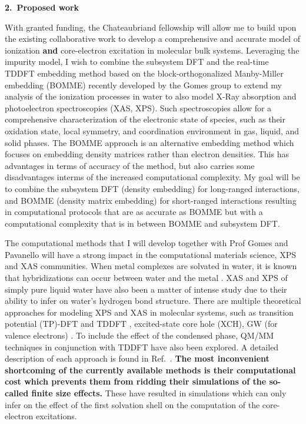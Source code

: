 \documentclass[notitlepage,12pt]{report}
\begin{document}
\textbf{\large 2.\ Proposed work}
    
    With granted funding, the Chateaubriand fellowship will allow me to build upon the existing collaborative work to develop a comprehensive and accurate model of ionization {\bf and } core-electron excitation in molecular bulk systems. Leveraging the impurity model, I wish to combine the subsystem DFT and the real-time TDDFT embedding method based on the block-orthogonalized Manby-Miller embedding (BOMME) \supercite{ding2017embedded,koh2017accelerating} recently  developed by the Gomes group \supercite{De_Santis_2020,de2021environment} to extend my analysis of the ionization processes in water to also model X-Ray absorption and photoelectron spectroscopies (XAS, XPS)\supercite{fransson2016x}. Such spectroscopies  allow for a comprehensive characterization of the electronic state of species, such as their oxidation state, local symmetry, and coordination environment in gas, liquid, and solid phases\supercite{rehr2005progress,koningsberger1987x}. The BOMME approach is an alternative embedding method which focuses on embedding density matrices rather than electron densities. This has advantages in terms of accuracy of the method, but also carries some disadvantages interms of the increased computational complexity. My goal will be to combine the subsystem DFT (density embedding) for long-ranged interactions, and BOMME (density matrix embedding) for short-ranged interactions resulting in computational protocols that are as accurate as BOMME but with a computational complexity that is in between BOMME and subsystem DFT.

    The computational methods that I will develop together with Prof Gomes and Pavanello will have a strong impact in the computational materials science,  XPS and XAS communities. When metal complexes are solvated in water, it is known that hybridizations can occur between water and the metal \supercite{N_slund_2003}.  XAS and XPS of simply pure liquid water have also been a matter of intense study \supercite{fransson2016x} due to their ability to infer on water's hydrogen bond structure. There are multiple theoretical approaches for modeling XPS and XAS in molecular systems, such as transition potential (TP)-DFT  and TDDFT \supercite{triguero1998calculations}, excited-state core hole (XCH)\supercite{prendergast2006x}, GW (for valence electrons) \supercite{vinson2012theoretical,chen2010x}. To include the effect of the condensed phase, QM/MM techniques in conjunction with TDDFT have also been explored.\supercite{list2014lanczos} A detailed description of each approach is found in Ref.\ \cite{fransson2016x}. {\bf The most inconvenient shortcoming of the currently available methods is their computational cost which prevents them from ridding their simulations of the so-called finite size effects.} These have resulted in simulations which can only infer on the effect of the first solvation shell on the computation of the core-electron excitations\supercite{de2021environment}. 
\end{document}
